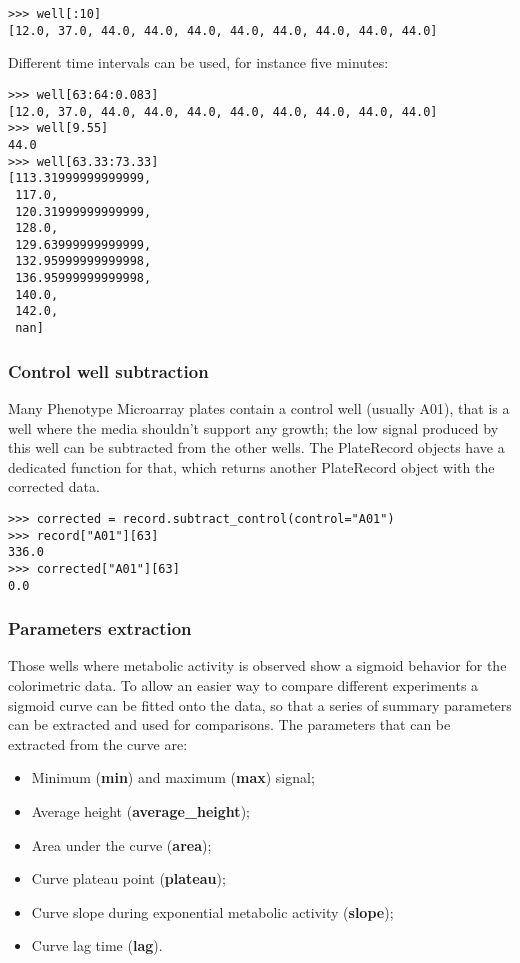 \begin{verbatim}
>>> well[:10]
[12.0, 37.0, 44.0, 44.0, 44.0, 44.0, 44.0, 44.0, 44.0, 44.0]
\end{verbatim}

Different time intervals can be used, for instance five minutes:
\begin{verbatim}
>>> well[63:64:0.083]
[12.0, 37.0, 44.0, 44.0, 44.0, 44.0, 44.0, 44.0, 44.0, 44.0]
>>> well[9.55]
44.0
>>> well[63.33:73.33]
[113.31999999999999,
 117.0,
 120.31999999999999,
 128.0,
 129.63999999999999,
 132.95999999999998,
 136.95999999999998,
 140.0,
 142.0,
 nan]
\end{verbatim}

\subsubsection{Control well subtraction}
Many Phenotype Microarray plates contain a control well (usually A01), that is a well where the media shouldn't support
any growth; the low signal produced by this well can be subtracted from the other wells.
The PlateRecord objects have a dedicated function for that, which returns another PlateRecord object
with the corrected data.

\begin{verbatim}
>>> corrected = record.subtract_control(control="A01")
>>> record["A01"][63]
336.0
>>> corrected["A01"][63]
0.0
\end{verbatim}

\subsubsection{Parameters extraction}
Those wells where metabolic activity is observed show a sigmoid behavior for the colorimetric data.
To allow an easier way to compare different experiments a sigmoid curve can be fitted onto the data,
so that a series of summary parameters can be extracted and used for comparisons.
The parameters that can be extracted from the curve are:

\begin{itemize}
  \item Minimum (\textbf{min}) and maximum (\textbf{max}) signal;

  \item Average height (\textbf{average\_height});

  \item Area under the curve (\textbf{area});

  \item Curve plateau point (\textbf{plateau});

  \item Curve slope during exponential metabolic activity (\textbf{slope});

  \item Curve lag time (\textbf{lag}).
\end{itemize}

